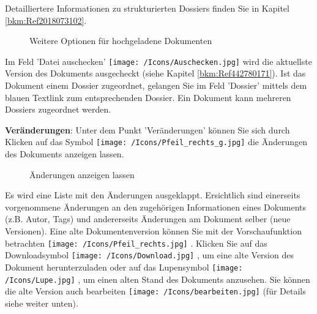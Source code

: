 Detailliertere Informationen zu strukturierten Dossiers finden Sie in Kapitel \ref{bkm:Ref2018073102}.

\vspace{\baselineskip}

\begin{figure}[H]
\caption{Weitere Optionen für hochgeladene Dokumenten}
\end{figure}

Im Feld 'Datei auschecken' \texttt{[image: /Icons/Auschecken.jpg]}  wird die aktuellste Version des Dokuments ausgecheckt (siehe Kapitel \ref{bkm:Ref442780171}). Ist das Dokument einem Dossier zugeordnet, gelangen Sie im Feld 'Dossier' mittels dem blauen Textlink  zum entsprechenden Dossier. Ein Dokument kann mehreren Dossiers zugeordnet werden.

\vspace{\baselineskip}

\textbf{Veränderungen}: Unter dem Punkt 'Veränderungen' können Sie sich durch Klicken auf das Symbol \texttt{[image: /Icons/Pfeil\_rechts\_g.jpg]}  die Änderungen des Dokuments anzeigen lassen.

\begin{figure}[H]
\caption{Änderungen anzeigen lassen}
\end{figure}

Es wird eine Liste mit den Änderungen ausgeklappt. Ersichtlich sind einerseits vorgenommene Änderungen an den zugehörigen Informationen eines Dokuments (z.B. Autor, Tags) und andererseits Änderungen am Dokument selber (neue Versionen). Eine alte Dokumentenversion können Sie mit der Vorschaufunktion betrachten \texttt{[image: /Icons/Pfeil\_rechts.jpg]} . Klicken Sie auf das Downloadsymbol \texttt{[image: /Icons/Download.jpg]} , um eine alte Version des Dokument herunterzuladen oder auf das Lupensymbol \texttt{[image: /Icons/Lupe.jpg]} , um einen alten Stand des Dokuments anzusehen. Sie können die alte Version auch bearbeiten \texttt{[image: /Icons/bearbeiten.jpg]}  (für Details siehe weiter unten).\newline

